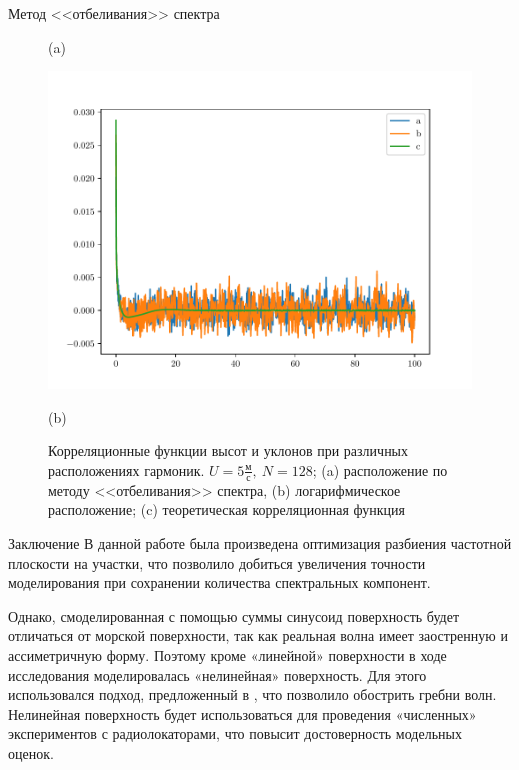 \begin{frame}[t]{}
\begin{columns}[t]
\begin{column}{.48\linewidth}
\begin{block}{Метод <<отбеливания>> спектра}
\begin{figure}[h]
\begin{minipage}{0.49\linewidth}
                            (a)
                    \end{minipage}
                    \begin{minipage}{0.49\linewidth}
                            \centering
                            \includegraphics[width=\linewidth]{fig/corr2}

                            (b)
                    \end{minipage}
                    \caption{Корреляционные функции высот и уклонов  при различных расположениях гармоник. $U=5\frac{\text{м}}{\text{с}},~ N = 128$; 
                    (a) расположение по методу <<отбеливания>> спектра, 
                    (b) логарифмическое расположение;
                    (c) теоретическая корреляционная функция }
                    \label{fig:}
                \end{figure}
        \end{block}
        \begin{block}{Заключение}
            \small
            В данной работе была произведена оптимизация разбиения частотной плоскости на участки, что позволило добиться увеличения точности моделирования при сохранении количества спектральных компонент.

Однако, смоделированная с помощью суммы синусоид поверхность будет отличаться от морской поверхности, так как реальная волна имеет заостренную и ассиметричную форму.  Поэтому кроме «линейной» поверхности в ходе исследования моделировалась «нелинейная» поверхность.
Для этого использовался подход, предложенный в \cite{CWM}, что позволило обострить гребни волн.  Нелинейная поверхность будет использоваться для проведения «численных» экспериментов с радиолокаторами, что повысит достоверность модельных оценок.



\end{block}
\end{column}
\end{columns}
\end{frame}
